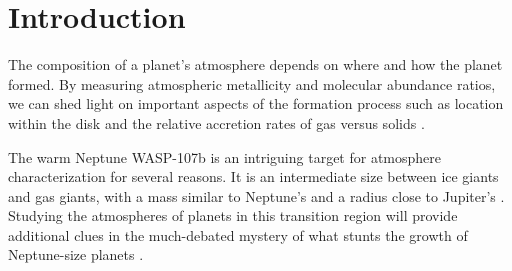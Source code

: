 \documentclass[twocolumn]{aastex61}
\begin{document}





\section{Introduction} \label{sec:intro}
The composition of a planet's atmosphere depends on where and how the planet formed. By measuring atmospheric metallicity and molecular abundance ratios, we can shed light on important aspects of the formation process such as location within the disk and the relative accretion rates of gas versus solids \citep[][]{oberg11, fortney13, madhusudhan14, alidib16, mordasini16, espinoza17}.  

The warm Neptune WASP-107b is an intriguing target for atmosphere characterization for several reasons.  It is an intermediate size between ice giants and gas giants, with a mass similar to Neptune's and a radius close to Jupiter's \citep[$0.12\,M_\mathrm{Jup}$, $0.94\,R_\mathrm{Jup}$;][]{anderson17}. Studying the atmospheres of planets in this transition region will provide additional clues in the much-debated mystery of what stunts the growth of Neptune-size planets \citep[e.g][]{pollack96, dawson16, frelikh17}.  
\end{document}
